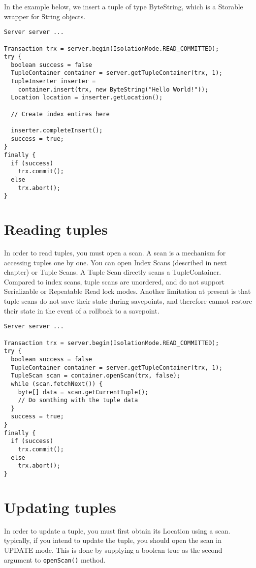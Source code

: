 \documentclass[a4paper,draft,oneside]{book}
\begin{document}
In the example below, we insert a tuple of type ByteString, which is
a Storable wrapper for String objects.

\begin{verbatim}
Server server ...

Transaction trx = server.begin(IsolationMode.READ_COMMITTED);
try {
  boolean success = false      
  TupleContainer container = server.getTupleContainer(trx, 1);
  TupleInserter inserter = 
    container.insert(trx, new ByteString("Hello World!"));
  Location location = inserter.getLocation();
 
  // Create index entires here

  inserter.completeInsert();
  success = true;
}
finally {
  if (success)
    trx.commit();
  else
    trx.abort();
}
\end{verbatim}

\section{Reading tuples}

In order to read tuples, you must open a scan. A scan is a mechanism
for accessing tuples one by one. You can open Index Scans (described
in next chapter) or Tuple Scans. A Tuple Scan directly scans a
TupleContainer.  Compared to index scans, tuple scans are unordered,
and do not support Serializable or Repeatable Read lock modes. Another
limitation at present is that tuple scans do not save their state
during savepoints, and therefore cannot restore their state in the event of
a rollback to a savepoint.

\begin{verbatim}
Server server ...

Transaction trx = server.begin(IsolationMode.READ_COMMITTED);
try {
  boolean success = false      
  TupleContainer container = server.getTupleContainer(trx, 1);
  TupleScan scan = container.openScan(trx, false);
  while (scan.fetchNext()) {
    byte[] data = scan.getCurrentTuple();
    // Do somthing with the tuple data
  }
  success = true;
}
finally {
  if (success)
    trx.commit();
  else
    trx.abort();
}
\end{verbatim}


\section{Updating tuples}

In order to update a tuple, you must first obtain its Location using a
scan. typically, if you intend to update the tuple, you should open the
scan in UPDATE mode. This is done by supplying a boolean true as the
second argument to \verb|openScan()| method.
\end{document}
